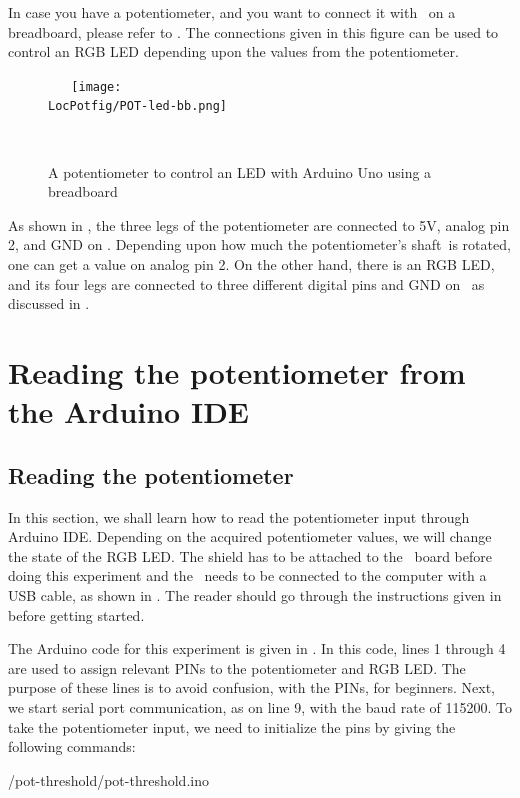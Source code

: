In case you have a potentiometer, and you want to connect it with \arduino\ on a breadboard, 
please refer to . The connections given in this figure 
can be used to control an RGB LED depending upon the values from the potentiometer.  
\begin{figure}
  \centering
  \texttt{[image: \\LocPotfig/POT-led-bb.png]}
  \caption{A potentiometer to control an LED with Arduino Uno using a breadboard}
  \label{fig:pot-led}
\end{figure}
As shown in , the three legs of the potentiometer are connected to 
5V, analog pin 2, and GND on \arduino. Depending upon how much the potentiometer's shaft is rotated, one can get a value on analog pin 2. On the other hand, 
there is an RGB LED, and its four legs are connected to three different digital pins and GND on \arduino\, as discussed in 
. 


\section{Reading the potentiometer from the Arduino IDE}
\subsection{Reading the potentiometer}
In this section, we shall learn how to read the potentiometer 
input through Arduino IDE. Depending on the acquired potentiometer 
values, we will change the state of the RGB LED. The shield has to be attached to the \arduino\ board
before doing this experiment and the \arduino\ needs to be connected to the computer 
with a USB cable, as shown in . The reader should go through the
instructions given in  before getting started.

The Arduino code for this experiment is given in . 
In this code, lines 1 through 4 are used to assign relevant PINs to 
the potentiometer and RGB LED. The purpose of these lines is to avoid 
confusion, with the PINs, for beginners. Next, we start serial port 
communication, as on line 9, with the baud rate of 115200. 
To take the potentiometer input, we need to initialize the pins by 
giving the following commands:


{\LocPotardcode/pot-threshold/pot-threshold.ino}

